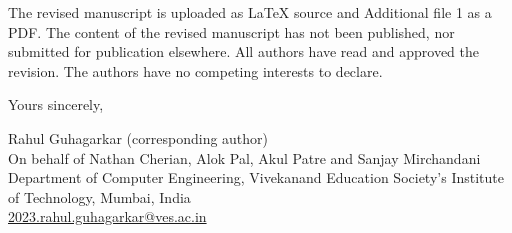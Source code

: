 \documentclass[11pt,a4paper]{article}
\begin{document}
The revised manuscript is uploaded as LaTeX source and Additional file 1 as a PDF. The content of the revised manuscript has not been published, nor submitted for publication elsewhere. All authors have read and approved the revision. The authors have no competing interests to declare.

Yours sincerely,

Rahul Guhagarkar (corresponding author)\\
On behalf of Nathan Cherian, Alok Pal, Akul Patre and Sanjay Mirchandani\\
Department of Computer Engineering, Vivekanand Education Society's Institute of Technology, Mumbai, India\\
\url{2023.rahul.guhagarkar@ves.ac.in}
\end{document}
